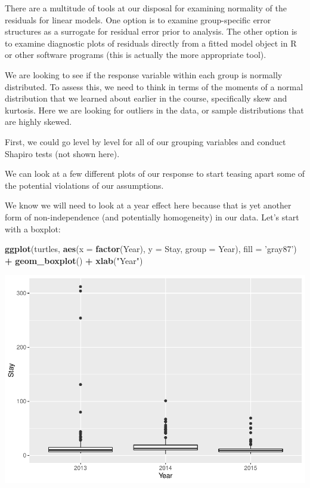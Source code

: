 \documentclass[
]{book}
\newenvironment{Shaded}{\begin{snugshade}}{\end{snugshade}}
\newcommand{\DataTypeTok}[1]{\textcolor[rgb]{0.13,0.29,0.53}{#1}}
\newcommand{\KeywordTok}[1]{\textcolor[rgb]{0.13,0.29,0.53}{\textbf{#1}}}
\newcommand{\NormalTok}[1]{#1}
\newcommand{\OperatorTok}[1]{\textcolor[rgb]{0.81,0.36,0.00}{\textbf{#1}}}
\newcommand{\StringTok}[1]{\textcolor[rgb]{0.31,0.60,0.02}{#1}}
\begin{document}
There are a multitude of tools at our disposal for examining normality of the residuals for linear models. One option is to examine group-specific error structures as a surrogate for residual error prior to analysis. The other option is to examine diagnostic plots of residuals directly from a fitted model object in R or other software programs (this is actually the more appropriate tool).

We are looking to see if the response variable within each group is normally distributed. To assess this, we need to think in terms of the moments of a normal distribution that we learned about earlier in the course, specifically skew and kurtosis. Here we are looking for outliers in the data, or sample distributions that are highly skewed.

First, we could go level by level for all of our grouping variables and conduct Shapiro tests (not shown here).

We can look at a few different plots of our response to start teasing apart some of the potential violations of our assumptions.

We know we will need to look at a year effect here because that is yet another form of non-independence (and potentially homogeneity) in our data. Let's start with a boxplot:

\begin{Shaded}
\begin{Highlighting}[]
\KeywordTok{ggplot}\NormalTok{(turtles, }
       \KeywordTok{aes}\NormalTok{(}\DataTypeTok{x =} \KeywordTok{factor}\NormalTok{(Year), }\DataTypeTok{y =}\NormalTok{ Stay, }\DataTypeTok{group =}\NormalTok{ Year), }\DataTypeTok{fill =} \StringTok{'gray87'}\NormalTok{) }\OperatorTok{+}
\StringTok{  }\KeywordTok{geom_boxplot}\NormalTok{() }\OperatorTok{+}
\StringTok{  }\KeywordTok{xlab}\NormalTok{(}\StringTok{"Year"}\NormalTok{)}
\end{Highlighting}
\end{Shaded}

\includegraphics{worstr_files/figure-latex/unnamed-chunk-229-1.pdf}
\end{document}
